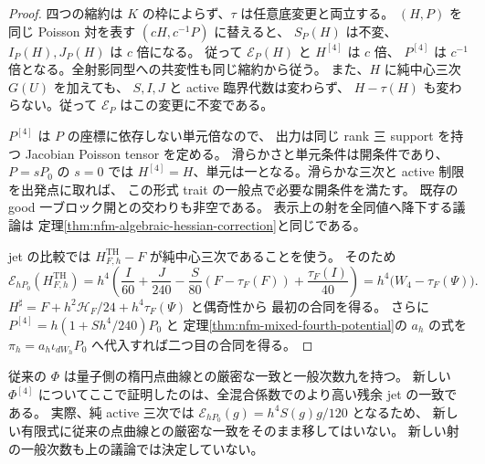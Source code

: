 \begin{proof}
四つの縮約は $K$ の枠によらず、$\tau$ は任意底変更と両立する。
$(H,P)$ を同じ Poisson 対を表す $(cH,c^{-1}P)$ に替えると、
$S_P(H)$ は不変、$I_P(H),J_P(H)$ は $c$ 倍になる。
従って $\mathcal E_P(H)$ と $H^{[4]}$ は $c$ 倍、
$P^{[4]}$ は $c^{-1}$ 倍となる。全射影同型への共変性も同じ縮約から従う。
また、$H$ に純中心三次 $G(U)$ を加えても、
$S,I,J$ と active 臨界代数は変わらず、
$H-\tau(H)$ も変わらない。従って $\mathcal E_P$ はこの変更に不変である。

$P^{[4]}$ は $P$ の座標に依存しない単元倍なので、
出力は同じ rank 三 support を持つ Jacobian Poisson tensor を定める。
滑らかさと単元条件は開条件であり、$P=sP_0$ の $s=0$ では
$H^{[4]}=H$、単元は一となる。滑らかな三次と active 制限を出発点に取れば、
この形式 trait の一般点で必要な開条件を満たす。
既存の good 一ブロック開との交わりも非空である。
表示上の射を全同値へ降下する議論は
定理\ref{thm:nfm-algebraic-hessian-correction}と同じである。

jet の比較では $H^{\mathrm{TH}}_{F,h}-F$ が純中心三次であることを使う。
そのため
\[
 \mathcal E_{hP_0}(H^{\mathrm{TH}}_{F,h})
 =h^4\left(\frac I{60}+\frac J{240}
          -\frac S{80}(F-\tau_F(F))+\frac{\tau_F(I)}{40}\right)
 =h^4\bigl(W_4-\tau_F(\Psi)\bigr).
\]
$H^\sharp=F+h^2\mathscr H_F/24+h^4\tau_F(\Psi)$ と偶奇性から
最初の合同を得る。
さらに $P^{[4]}=h(1+Sh^4/240)P_0$ と
定理\ref{thm:nfm-mixed-fourth-potential}の $a_h$ の式を
$\pi_h=a_h\iota_{dW_h}P_0$ へ代入すれば二つ目の合同を得る。
\end{proof}

\begin{remark}[有限補正の二つの役割]
従来の $\Phi$ は量子側の楕円点曲線との厳密な一致と一般次数九を持つ。
新しい $\Phi^{[4]}$ についてここで証明したのは、全混合係数でのより高い残余 jet の一致である。
実際、純 active 三次では $\mathcal E_{hP_0}(g)=h^4S(g)g/120$ となるため、
新しい有限式に従来の点曲線との厳密な一致をそのまま移してはいない。
新しい射の一般次数も上の議論では決定していない。
\end{remark}
